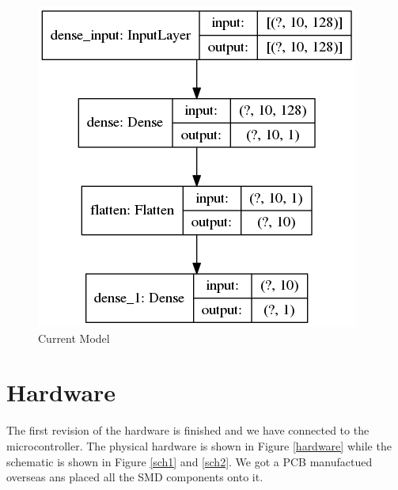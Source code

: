 \documentclass{article}
\begin{document}
\begin{figure}[H]
\centering
\includegraphics[scale=0.3]{../NN/audio/src/model.png}
\caption{Current Model}
\label{model}
\end{figure}
\newpage

\section{Hardware}
The first revision of the hardware is finished and we have connected to the microcontroller. The physical hardware is shown in Figure \ref{hardware} while the schematic is shown in Figure \ref{sch1} and \ref{sch2}. We got a PCB manufactued overseas ans placed all the SMD components onto it.
 
\end{document}
